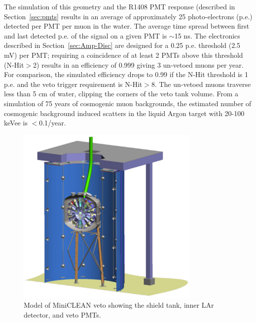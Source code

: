 \documentclass[preprint,12pt]{elsarticle}
\begin{document}
The simulation of this geometry and the R1408 PMT response (described
in Section~\ref{sec:pmts} results in an average of approximately 25
photo-electrons (p.e.) detected per PMT per muon in the water.  The
average time spread between first and last detected p.e. of the signal
on a given PMT is $\sim$15 ns.  The electronics described in
Section~\ref{sec:Amp-Disc} are designed for a 0.25 p.e. threshold (2.5
mV) per PMT; requiring a coincidence of at least 2 PMTs above this
threshold (N-Hit$>$2) results in an efficiency of 0.999 giving 3
un-vetoed muons per year.  For comparison, the simulated efficiency
drops to 0.99 if the N-Hit threshold is 1 p.e. and the veto trigger
requirement is N-Hit$>$8.  The un-vetoed muons traverse less than 5 cm
of water, clipping the corners of the veto tank volume.  From a
simulation of 75 years of cosmogenic muon backgrounds, the estimated
number of cosmogenic background induced scatters in the liquid Argon
target with 20-100 keVee is $<$0.1/year.

\begin{figure}[h]
\begin{center}
\includegraphics[width=3.5in]{graphics/miniclean_overview_drawing.pdf}
\caption{Model of MiniCLEAN veto showing the shield tank, inner LAr detector, and veto PMTs.
\label{fig:veto_geom}}
\end{center}
\end{figure}
\end{document}
